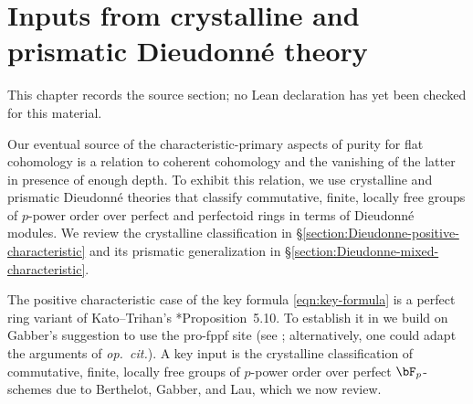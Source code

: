 \chapter{Inputs from crystalline and prismatic Dieudonn\'{e} theory}
\label{purity-flat-cohomology-chapter-04}

\begin{remark}
\label{purity-flat-cohomology-chapter-04-source}
This chapter records the source section; no Lean declaration has yet been checked for this material.
\notready
\end{remark}

\label{chapter:Dieudonne-theory}


Our eventual source of the characteristic-primary aspects of purity for flat cohomology is a relation to coherent cohomology and the vanishing of the latter in presence of enough depth. To exhibit this relation, we use crystalline and prismatic Dieudonn\'{e} theories that classify commutative, finite, locally free groups of $p$-power order over perfect and perfectoid rings in terms of Dieudonn\'{e} modules. We review the crystalline classification in \S\ref{section:Dieudonne-positive-characteristic} and its prismatic generalization in \S\ref{section:Dieudonne-mixed-characteristic}. %










 \label{section:Dieudonne-positive-characteristic}

The positive characteristic case of the key formula \eqref{eqn:key-formula} is a perfect ring variant of Kato--Trihan's \cite{KT03}*{Proposition~5.10}. To establish it in  we build on  Gabber's suggestion to use the pro-fppf site (see ; alternatively, one could adapt the arguments of \emph{op.~cit.}). A key input %
is the crystalline classification of commutative, finite, locally free groups of $p$-power order over perfect $\bF_p$-schemes due to Berthelot, Gabber, and Lau, which we now review.

